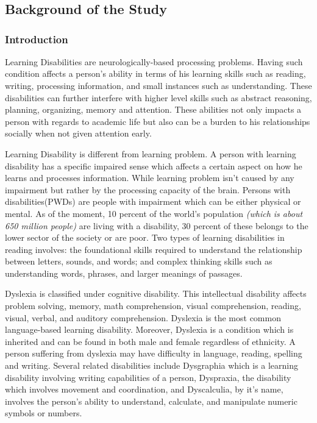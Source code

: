 \documentclass[letterpaper, 12pt, oneside]{book}
\begin{document}
\chapter{}
\section{Background of the Study}
\subsection{Introduction}

	Learning Disabilities are neurologically-based processing problems. Having such condition affects a person’s ability in terms of his learning skills such as reading, writing, processing information, and small instances such as understanding. These disabilities can further interfere with higher level skills such as abstract reasoning, planning, organizing, memory and attention. These abilities not only impacts a person with regards to academic life but also can be a burden to his relationships socially when not given attention early.\newline

Learning Disability is different from learning problem. A person with learning disability has a specific impaired sense which affects a certain aspect on how he learns and processes information. While learning problem isn’t caused by any impairment but rather by the processing capacity of the brain. Persons with disabilities(PWDs) are people with impairment which can be either physical or mental. As of the moment, 10 percent of the world’s population \textit{(which is about 650 million people)} are living with a disability, 30 percent of these belongs to the lower sector of the society or are poor. Two types of learning disabilities in reading involves: the foundational skills required to understand the relationship between letters, sounds, and words; and complex thinking skills such as understanding words, phrases, and larger meanings of passages.\newline

Dyslexia is classified under cognitive disability. This intellectual disability affects problem solving, memory, math comprehension, visual comprehension, reading, visual, verbal, and auditory comprehension. Dyslexia is the most common language-based learning disability. Moreover, Dyslexia is a condition which is inherited and can be found in both male and female regardless of ethnicity. A person suffering from dyslexia may have difficulty in language, reading, spelling and writing. Several related disabilities include Dysgraphia which is a learning disability involving writing capabilities of a person, Dyspraxia, the disability which involves movement and coordination, and Dyscalculia, by it’s name, involves the person’s ability to understand, calculate, and manipulate numeric symbols or numbers.\newline
\end{document}
